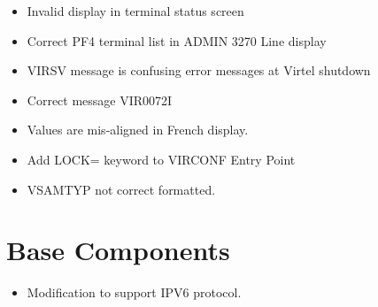 \documentclass[letterpaper,10pt,english]{sphinxmanual}
\begin{document}
\begin{itemize}
\item {} 
Invalid display in terminal status screen

\end{itemize}

\begin{itemize}
\item {} 
Correct PF4 terminal list in ADMIN 3270 Line display

\end{itemize}

\begin{itemize}
\item {} 
VIRSV message is confusing error messages at Virtel shutdown

\end{itemize}

\begin{itemize}
\item {} 
Correct message VIR0072I

\end{itemize}

\begin{itemize}
\item {} 
Values are mis-aligned in French display.

\end{itemize}

\begin{itemize}
\item {} 
Add LOCK= keyword to VIRCONF Entry Point

\end{itemize}

\begin{itemize}
\item {} 
VSAMTYP not correct formatted.

\end{itemize}

\newpage


\section{Base Components}
\label{\detokenize{TN202303:base-components}}
\begin{itemize}
\item {} 
Modification to support IPV6 protocol.

\end{itemize}
\end{document}
